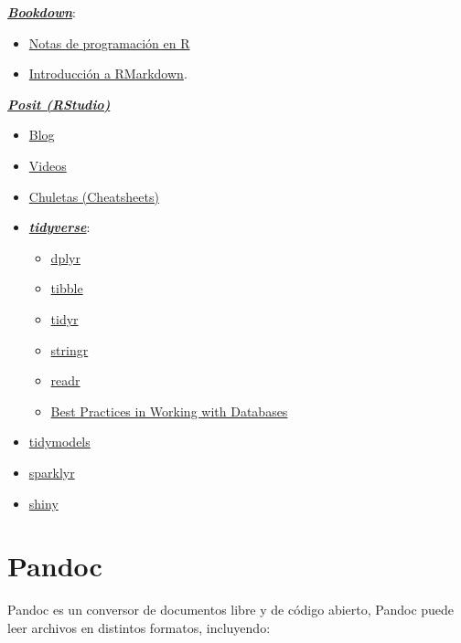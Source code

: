 \documentclass[
]{book}
\theoremstyle{break}
\theoremstyle{nonumberplain}
\begin{document}
\href{https://bookdown.org}{\textbf{\emph{Bookdown}}}:

\begin{itemize}
\item
  \href{https://rubenfcasal.github.io/book_notasr/}{Notas de programación en R}
\item
  \href{https://rubenfcasal.github.io/bookdown_intro/rmarkdown.html}{Introducción a RMarkdown}.
\end{itemize}

\href{https://posit.co}{\textbf{\emph{Posit (RStudio)}}}

\begin{itemize}
\item
  \href{https://posit.co/blog}{Blog}
\item
  \href{https://posit.co/resources/videos}{Videos}
\item
  \href{https://posit.co/resources/cheatsheets}{Chuletas (Cheatsheets)}
\item
  \href{https://www.tidyverse.org/}{\textbf{\emph{tidyverse}}}:

  \begin{itemize}
  \item
    \href{https://dplyr.tidyverse.org}{dplyr}
  \item
    \href{https://tibble.tidyverse.org}{tibble}
  \item
    \href{https://tidyr.tidyverse.org}{tidyr}
  \item
    \href{https://stringr.tidyverse.org}{stringr}
  \item
    \href{https://readr.tidyverse.org}{readr}
  \item
    \href{https://solutions.posit.co/connections/db}{Best Practices in Working with Databases}
  \end{itemize}
\item
  \href{https://www.tidymodels.org}{tidymodels}
\item
  \href{https://spark.rstudio.com/}{sparklyr}
\item
  \href{http://shiny.rstudio.com}{shiny}
\end{itemize}

\hypertarget{appendix-apuxe9ndices}{%
\appendix}


\hypertarget{pandoc}{%
\chapter{Pandoc}\label{pandoc}}

Pandoc es un conversor de documentos libre y de código abierto,
Pandoc puede leer archivos en distintos formatos, incluyendo:
\end{document}
